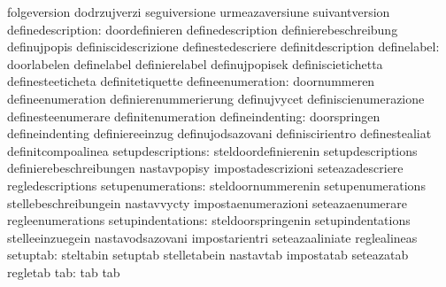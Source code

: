                                   folgeversion                     dodrzujverzi
                                  seguiversione                    urmeazaversiune
                                  suivantversion
               definedescription: doordefinieren                   definedescription
                                  definierebeschreibung            definujpopis
                                  definiscidescrizione             definestedescriere
                                  definitdescription
                     definelabel: doorlabelen                      definelabel
                                  definierelabel                   definujpopisek
                                  definiscietichetta               definesteeticheta
                                  definitetiquette
               defineenumeration: doornummeren                     defineenumeration
                                  definierenummerierung            definujvycet
                                  definiscienumerazione            definesteenumerare
                                  definitenumeration
                 defineindenting: doorspringen                     defineindenting
                                  definiereeinzug                  definujodsazovani
                                  definiscirientro                 definestealiat
                                  definitcompoalinea
               setupdescriptions: steldoordefinierenin             setupdescriptions
                                  definierebeschreibungen          nastavpopisy
                                  impostadescrizioni               seteazadescriere
                                  regledescriptions
               setupenumerations: steldoornummerenin               setupenumerations
                                  stellebeschreibungein            nastavvycty
                                  impostaenumerazioni              seteazaenumerare
                                  regleenumerations
               setupindentations: steldoorspringenin               setupindentations
                                  stelleeinzuegein                 nastavodsazovani
                                  impostarientri                   seteazaaliniate
                                  reglealineas
                        setuptab: steltabin                        setuptab
                                  stelletabein                     nastavtab
                                  impostatab                       seteazatab
                                  regletab
                             tab: tab                              tab
